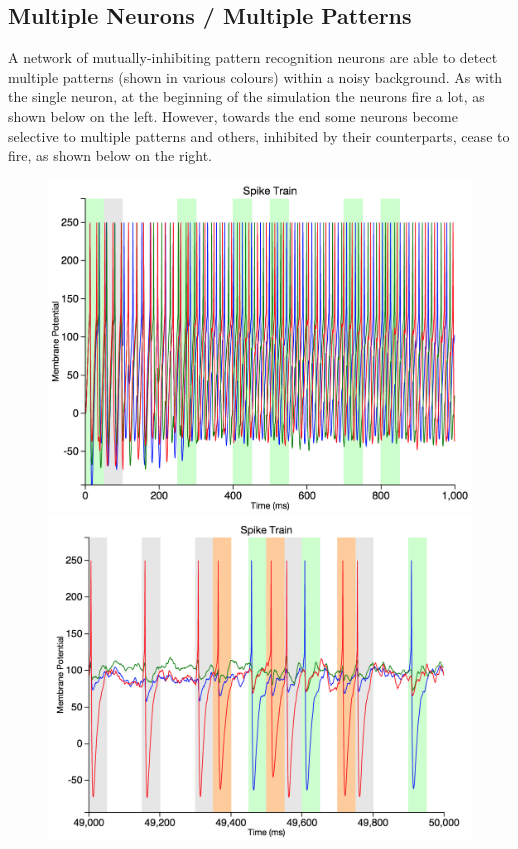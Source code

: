 \documentclass[a4paper,11pt]{article}
\begin{document}
\begin{appendices}
\newpage

\subsection{Multiple Neurons / Multiple Patterns}
A network of mutually-inhibiting pattern recognition neurons are able to detect multiple patterns (shown in various colours) within a noisy background. As with the single neuron, at the beginning of the simulation the neurons fire a lot, as shown below on the left. However, towards the end some neurons become selective to multiple patterns and others, inhibited by their counterparts, cease to fire, as shown below on the right.

\begin{figure}[h]
\centering
\includegraphics[scale = 0.3]{multiple_beginning}
\includegraphics[scale = 0.3]{multiple_end}
\end{figure}


\end{appendices}
\end{document}
